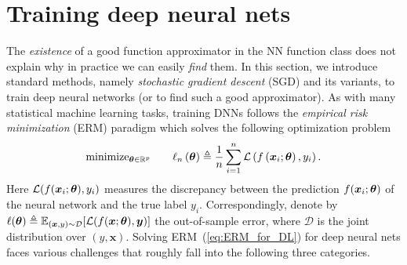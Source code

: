 \section{Training deep neural nets }\label{sec:opt}
The \textit{existence} of a good function approximator in the NN function class does not explain why in practice we can easily \textit{find} them.
In this section, we introduce standard methods, namely \emph{stochastic gradient descent} (SGD) and its variants, to train deep neural networks (or to find such a good approximator). As with many statistical machine learning tasks, training DNNs follows the \emph{empirical risk minimization} (ERM) paradigm which solves the following optimization problem
\begin{equation}
\text{minimize}_{\text{\boldmath $\theta$}\in\mathbb{R}^{p}}\qquad\ell_{n}\left(\text{\boldmath $\theta$}\right)\triangleq\frac{1}{n}\sum_{i=1}^{n}\mathcal{L}\left(f\left(\bm{x}_{i};\text{\boldmath $\theta$}\right),y_{i}\right).\label{eq:ERM_for_DL}
\end{equation}
Here $\mathcal{L}(f(\bm{x}_{i};\text{\boldmath $\theta$}),y_{i})$ measures the discrepancy between the prediction $f(\bm{x}_{i};\text{\boldmath $\theta$})$ of the neural network and the true label $y_{i}$. Correspondingly, denote by $\ell(\text{\boldmath $\theta$}) \triangleq \mathbb{E}_{(\bm{x},y)\sim\mathcal{D}}[\mathcal{L}(f(\bm{x};\text{\boldmath $\theta$}),\bm{y})]$ the out-of-sample error, where $\mathcal{D}$ is the joint distribution over $(y, \bm{x})$.  Solving ERM~(\ref{eq:ERM_for_DL}) for deep neural nets faces various challenges that roughly fall into the following three categories.
